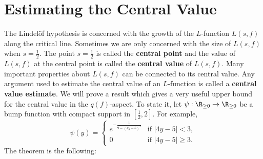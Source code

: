   \section{Estimating the Central Value}
    The Lindel\"of hypothesis is concerned with the growth of the $L$-function $L(s,f)$ along the critical line. Sometimes we are only concerned with the size of $L(s,f)$ when $s = \frac{1}{2}$. The point $s = \frac{1}{2}$ is called the \textbf{central point} and the value of $L(s,f)$ at the central point is called the \textbf{central value} of $L(s,f)$. Many important properties about $L(s,f)$ can be connected to its central value. Any argument used to estimate the central value of an $L$-function is called a \textbf{central value estimate}. We will prove a result which gives a very useful upper bound for the central value in the $q(f)$-aspect. To state it, let $\psi:\R_{\ge 0} \to \R_{\ge 0}$ be a bump function with compact support in $\left[\frac{1}{2},2\right]$. For example,
    \[
      \psi(y) = \begin{cases} e^{-\frac{1}{9-(4y-5)^{2}}} & \text{if $|4y-5| < 3$}, \\ 0 & \text{if $|4y-5| \ge 3$}. \end{cases}
    \]
    The theorem is the following:

